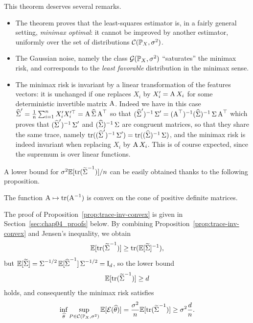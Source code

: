 This theorem deserves several remarks.
\begin{itemize}
	\item The theorem proves that the least-squares estimator is, in a fairly general setting, \emph{minimax optimal}: it cannot be improved by another estimator, uniformly over the set of distributions $\cC(\P_X, \sigma^2)$.
	\item The Gaussian noise, namely the class $\cG(\P_X, \sigma^2)$ ``saturates'' the minimax risk, and corresponds to the \emph{least favorable} distribution in the minimax sense.
	\item The minimax risk is invariant by a linear transformation of the features vectors: it is unchanged if one replaces $X_i$ by $X_i' = \bA X_i$ for some deterministic invertible matrix $\bA$. Indeed we have in this case $\wh \bSigma' = \frac 1n \sum_{i=1}^n X_i' X_i'^\top = \bA \wh \bSigma \bA^\top$ so that $(\wh \bSigma')^{-1} \bSigma' = (\bA^\top)^{-1} (\wh \bSigma)^{-1} \bSigma \bA^\top$ which proves that $(\wh \bSigma')^{-1} \bSigma'$ and $(\wh \bSigma)^{-1} \bSigma$ are congruent matrices, so that they share the same trace, namely $\tr((\wh \bSigma')^{-1} \bSigma') = \tr((\wh \bSigma)^{-1} \bSigma)$, and the minimax risk is indeed invariant when replacing $X_i$ by $\bA X_i$. This is of course expected, since the supremum is over linear functions.
\end{itemize}
A lower bound for $\sigma^2 \E [\tr(\wt \bSigma ^{-1})] / n$ can be easily obtained thanks to the following proposition.
\begin{proposition}
	\label{prop:trace-inv-convex}
	The function $\bA \mapsto \tr( \bA^{-1})$ is convex on the cone of positive definite matrices.
\end{proposition}
The proof of Proposition~\ref{prop:trace-inv-convex} is given in Section~\ref{sec:chap04_proofs} below.
By combining Proposition~\ref{prop:trace-inv-convex} and Jensen's inequality, we obtain
\begin{equation*}
	\E [\tr({\wt \bSigma}^{-1}) ] \geq \tr (\E [\wt \bSigma]^{-1} ),
\end{equation*}
but $\E[\wt \bSigma] = \bSigma^{-1/2} \E [\wh \bSigma^{-1}] \bSigma^{-1/2} = \bI_d$, so the lower bound 
\begin{equation*}
	\E [\tr( \wt \bSigma^{-1})] \geq d
\end{equation*}
holds, and consequently the minimax risk satisfies
\begin{equation}
	\label{eq:first-explicit-minimax-lower-bound}
	\inf_{\wh \theta} \sup_{P \in \cC(\P_X, \sigma^2)} \E [\cE(\wh \theta)] 
	= \frac{\sigma^2}{n} \E [\tr(\wt \bSigma ^{-1})] \geq \sigma^2 \frac dn.
\end{equation}

